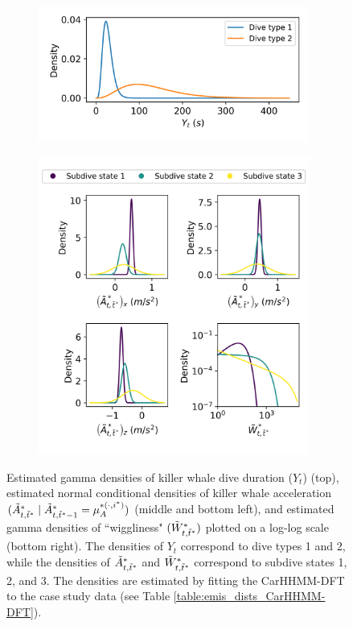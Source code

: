 \begin{figure}[ht]
    \begin{subfigure}{\textwidth}
    	\centering
    	\includegraphics[width=3.5in]{../Plots/2019/20190902-182840-CATs_OB_1_0_267_CarHHMM2-coarse-emissions.png}
    \end{subfigure}
    \newline
    \begin{subfigure}{\textwidth}
    	\centering
    	\includegraphics[width=3.5in]{../Plots/2019/20190902-182840-CATs_OB_1_0_267_CarHHMM2-fine-emissions.png}
    \end{subfigure}
    \caption{Estimated gamma densities of killer whale dive duration ($Y_t$) (top), estimated normal conditional densities of killer whale acceleration $(\tilde{A}^*_{t,\tilde t^*} \mid \tilde{A}^*_{t,\tilde t^*-1} = \mu_A^{*(\cdot,i^*)})$ (middle and bottom left), and estimated gamma densities of ``wiggliness" $(\tilde{W}^*_{t,\tilde t^*})$ plotted on a log-log scale (bottom right). The densities of $Y_t$ correspond to dive types 1 and 2, while the densities of $\tilde{A}^*_{t,\tilde t^*}$ and $\tilde{W}^*_{t,\tilde t^*}$ correspond to subdive states 1, 2, and 3. The densities are estimated by fitting the CarHHMM-DFT to the case study data (see Table \ref{table:emis_dists_CarHHMM-DFT}).}
    \label{fig:emis}
\end{figure}

